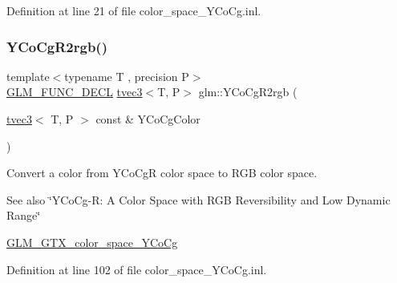 Definition at line 21 of file color\+\_\+space\+\_\+\+Y\+Co\+Cg.\+inl.

\mbox{\label{group__gtx__color__space___y_co_cg_ga4bac5462c00df0ae89242ecdbbe5dbad}} 
\subsubsection{\texorpdfstring{YCoCgR2rgb()}{YCoCgR2rgb()}}
{\footnotesize\ttfamily template$<$typename T , precision P$>$ \\
\mbox{\hyperlink{setup_8hpp_ab2d052de21a70539923e9bcbf6e83a51}{G\+L\+M\+\_\+\+F\+U\+N\+C\+\_\+\+D\+E\+CL}} \mbox{\hyperlink{structglm_1_1tvec3}{tvec3}}$<$T, P$>$ glm\+::\+Y\+Co\+Cg\+R2rgb (\begin{DoxyParamCaption}\item[{\mbox{\hyperlink{structglm_1_1tvec3}{tvec3}}$<$ T, P $>$ const \&}]{Y\+Co\+Cg\+Color }\end{DoxyParamCaption})}

Convert a color from Y\+Co\+CgR color space to R\+GB color space. \begin{DoxySeeAlso}{See also}
\char`\"{}\+Y\+Co\+Cg-\/\+R\+: A Color Space with R\+G\+B Reversibility and Low Dynamic Range\char`\"{} 

\mbox{\hyperlink{group__gtx__color__space___y_co_cg}{G\+L\+M\+\_\+\+G\+T\+X\+\_\+color\+\_\+space\+\_\+\+Y\+Co\+Cg}} 
\end{DoxySeeAlso}


Definition at line 102 of file color\+\_\+space\+\_\+\+Y\+Co\+Cg.\+inl.

